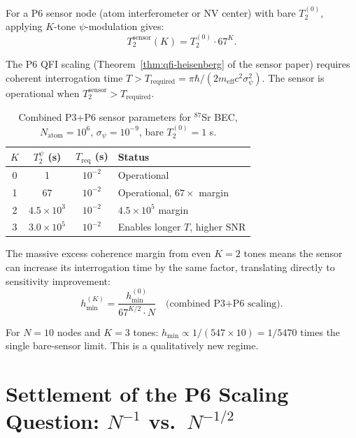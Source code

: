 \documentclass[11pt]{article}
\theoremstyle{definition}
\theoremstyle{remark}
\begin{document}
For a P6 sensor node (atom interferometer or NV center) with bare
$T_2^{(0)}$, applying $K$-tone $\psi$-modulation gives:
\begin{equation}
T_2^{\mathrm{sensor}}(K) = T_2^{(0)} \cdot 67^K.
\end{equation}

The P6 QFI scaling (Theorem~\ref{thm:qfi-heisenberg} of the sensor
paper) requires coherent interrogation time $T > T_{\mathrm{required}}
= \pi\hbar/(2 m_{\mathrm{eff}} c^2 \sigma_\psi^2)$. The sensor is
operational when $T_2^{\mathrm{sensor}} > T_{\mathrm{required}}$.

\begin{table}[h]
\centering
\caption{Combined P3+P6 sensor parameters for $^{87}$Sr BEC,
$N_{\mathrm{atom}} = 10^6$, $\sigma_\psi = 10^{-9}$,
bare $T_2^{(0)} = 1$ s.}
\label{tab:combined-sensor}
\begin{tabular}{@{}cccl@{}}
\toprule
$K$ & $T_2^{\psi}$ (s) & $T_{\mathrm{req}}$ (s) & Status \\
\midrule
0 & 1 & $10^{-2}$ & Operational \\
1 & 67 & $10^{-2}$ & Operational, $67\times$ margin \\
2 & $4.5\times 10^3$ & $10^{-2}$ & $4.5\times 10^5$ margin \\
3 & $3.0\times 10^5$ & $10^{-2}$ & Enables longer $T$, higher SNR \\
\bottomrule
\end{tabular}
\end{table}

The massive excess coherence margin from even $K=2$ tones means the
sensor can increase its interrogation time by the same factor,
translating directly to sensitivity improvement:
\begin{equation}
\boxed{h_{\min}^{(K)} = \frac{h_{\min}^{(0)}}{67^{K/2}\cdot N}
\quad \text{(combined P3+P6 scaling)}}.
\end{equation}

For $N = 10$ nodes and $K = 3$ tones:
$h_{\min} \propto 1/(547 \times 10) = 1/5470$ times the single
bare-sensor limit. This is a qualitatively new regime.

\section{Settlement of the P6 Scaling Question: $N^{-1}$ vs.\ $N^{-1/2}$}
\label{sec:scaling-settlement}
\end{document}
